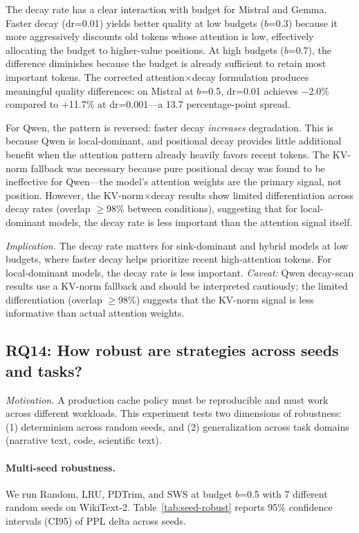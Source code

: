 \documentclass[11pt]{article}
\newcommand{\sws}{SWS}
\newcommand{\pct}{\%}
\theoremstyle{definition}
\theoremstyle{plain}
\begin{document}
The decay rate has a clear interaction with budget for Mistral and Gemma.  Faster decay (dr=0.01) yields better quality at low budgets ($b$=0.3) because it more aggressively discounts old tokens whose attention is low, effectively allocating the budget to higher-value positions.  At high budgets ($b$=0.7), the difference diminishes because the budget is already sufficient to retain most important tokens.  The corrected attention$\times$decay formulation produces meaningful quality differences: on Mistral at $b$=0.5, dr=0.01 achieves $-$2.0\pct{} compared to +11.7\pct{} at dr=0.001---a 13.7 percentage-point spread.

For Qwen, the pattern is reversed: faster decay \emph{increases} degradation.  This is because Qwen is local-dominant, and positional decay provides little additional benefit when the attention pattern already heavily favors recent tokens.  The KV-norm fallback was necessary because pure positional decay was found to be ineffective for Qwen---the model's attention weights are the primary signal, not position.  However, the KV-norm$\times$decay results show limited differentiation across decay rates (overlap $\ge$98\pct{} between conditions), suggesting that for local-dominant models, the decay rate is less important than the attention signal itself.

\emph{Implication.}  The decay rate matters for sink-dominant and hybrid models at low budgets, where faster decay helps prioritize recent high-attention tokens.  For local-dominant models, the decay rate is less important.  \emph{Caveat:} Qwen decay-scan results use a KV-norm fallback and should be interpreted cautiously; the limited differentiation (overlap $\ge$98\pct{}) suggests that the KV-norm signal is less informative than actual attention weights.

\subsection{RQ14: How robust are strategies across seeds and tasks?}
\label{sec:rq14}

\emph{Motivation.}  A production cache policy must be reproducible and must work across different workloads.  This experiment tests two dimensions of robustness: (1) determinism across random seeds, and (2) generalization across task domains (narrative text, code, scientific text).

\paragraph{Multi-seed robustness.}  We run Random, LRU, PDTrim, and \sws{} at budget $b$=0.5 with 7 different random seeds on WikiText-2.  Table~\ref{tab:seed-robust} reports 95\pct{} confidence intervals (CI95) of PPL delta across seeds.
\end{document}
